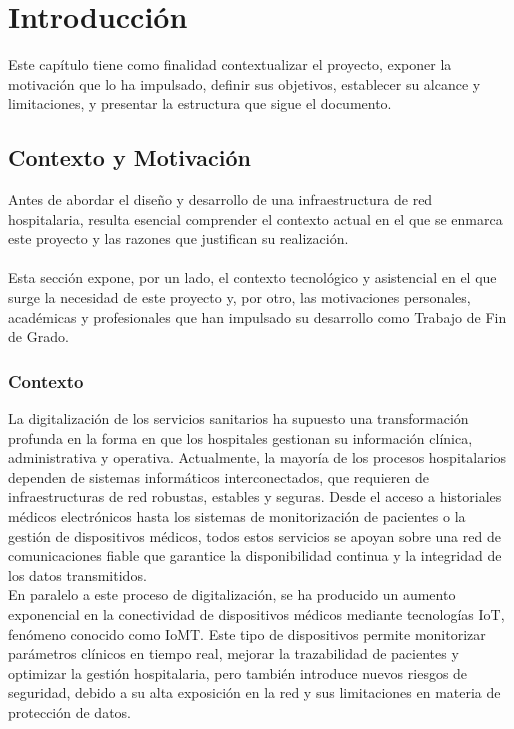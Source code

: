 
\chapter{Introducción}
Este capítulo tiene como finalidad contextualizar el proyecto, exponer la motivación que lo ha impulsado, definir sus objetivos, establecer su alcance y limitaciones, 
y presentar la estructura que sigue el documento. 

\section{Contexto y Motivación}
Antes de abordar el diseño y desarrollo de una infraestructura de red hospitalaria, resulta esencial comprender el contexto actual en el que se enmarca 
este proyecto y las razones que justifican su realización.
\\ \\
Esta sección expone, por un lado, el contexto tecnológico y asistencial en el que surge la necesidad de este proyecto y, por otro, las motivaciones personales, 
académicas y profesionales que han impulsado su desarrollo como Trabajo de Fin de Grado.
\subsection{Contexto}
La digitalización de los servicios sanitarios ha supuesto una transformación profunda en la forma en que los hospitales gestionan su información clínica, administrativa y 
operativa. Actualmente, la mayoría de los procesos hospitalarios dependen de sistemas informáticos interconectados, que requieren de infraestructuras de red robustas, estables 
y seguras. Desde el acceso a historiales médicos electrónicos hasta los sistemas de monitorización de pacientes o la gestión de dispositivos médicos, todos estos servicios 
se apoyan sobre una red de comunicaciones fiable que garantice la disponibilidad continua y la integridad de los datos transmitidos. \\ 

En paralelo a este proceso de digitalización, se ha producido un aumento exponencial en la conectividad de dispositivos médicos mediante tecnologías \ac{IoT}, fenómeno conocido 
como \ac{IoMT}. Este tipo de dispositivos permite monitorizar parámetros clínicos en tiempo real, mejorar la trazabilidad de pacientes y optimizar 
la gestión hospitalaria, pero también introduce nuevos riesgos de seguridad, debido a su alta exposición en la red y sus limitaciones en materia de protección de datos. \\ 

